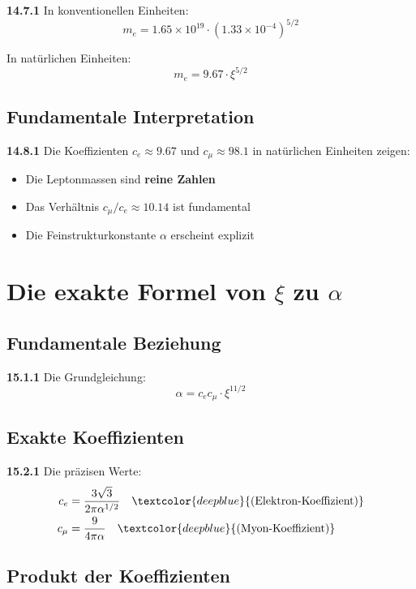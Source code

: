 \noindent \textbf{14.7.1} In konventionellen Einheiten:
\[
m_e = 1.65 \times 10^{19} \cdot (1.33 \times 10^{-4})^{5/2}
\]

In natürlichen Einheiten:
\[
m_e = 9.67 \cdot \xi^{5/2}
\]

\subsection{Fundamentale Interpretation}

\noindent \textbf{14.8.1} Die Koeffizienten $c_e \approx 9.67$ und $c_\mu \approx 98.1$ in natürlichen Einheiten zeigen:

\begin{itemize}
	\item Die Leptonmassen sind \textbf{reine Zahlen}
	\item Das Verhältnis $c_\mu/c_e \approx 10.14$ ist fundamental
	\item Die Feinstrukturkonstante $\alpha$ erscheint explizit
\end{itemize}

\section{Die exakte Formel von $\xi$ zu $\alpha$}

\subsection{Fundamentale Beziehung}

\noindent \textbf{15.1.1} Die Grundgleichung:
\[
\boxed{\alpha = c_e c_\mu \cdot \xi^{11/2}}
\]

\subsection{Exakte Koeffizienten}

\noindent \textbf{15.2.1} Die präzisen Werte:
\begin{align*}
	c_e &= \frac{3\sqrt{3}}{2\pi\alpha^{1/2}} \quad \textcolor{deepblue}{\text{(Elektron-Koeffizient)}} \\
	c_\mu &= \frac{9}{4\pi\alpha} \quad \textcolor{deepblue}{\text{(Myon-Koeffizient)}}
\end{align*}

\subsection{Produkt der Koeffizienten}

